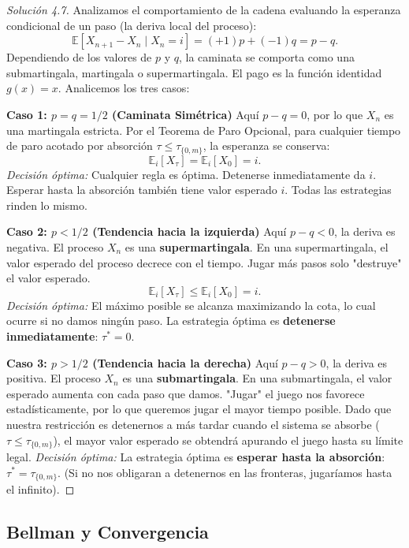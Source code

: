 \documentclass[10pt,a4paper]{article}
\begin{document}
\begin{proof}[Solución 4.7]
    Analizamos el comportamiento de la cadena evaluando la esperanza condicional de un paso (la deriva local del proceso):
    \[ \mathbb{E}[X_{n+1} - X_n \mid X_n = i] = (+1)p + (-1)q = p - q. \]
    Dependiendo de los valores de $p$ y $q$, la caminata se comporta como una submartingala, martingala o supermartingala. El pago es la función identidad $g(x) = x$. Analicemos los tres casos:

    \textbf{Caso 1: $p = q = 1/2$ (Caminata Simétrica)}
    Aquí $p - q = 0$, por lo que $X_n$ es una martingala estricta. 
    Por el Teorema de Paro Opcional, para cualquier tiempo de paro acotado por absorción $\tau \le \tau_{\{0,m\}}$, la esperanza se conserva:
    \[ \mathbb{E}_i[X_\tau] = \mathbb{E}_i[X_0] = i. \]
    \textit{Decisión óptima:} Cualquier regla es óptima. Detenerse inmediatamente da $i$. Esperar hasta la absorción también tiene valor esperado $i$. Todas las estrategias rinden lo mismo.

    \textbf{Caso 2: $p < 1/2$ (Tendencia hacia la izquierda)}
    Aquí $p - q < 0$, la deriva es negativa. El proceso $X_n$ es una \textbf{supermartingala}. 
    En una supermartingala, el valor esperado del proceso decrece con el tiempo. Jugar más pasos solo "destruye" el valor esperado.
    \[ \mathbb{E}_i[X_\tau] \le \mathbb{E}_i[X_0] = i. \]
    \textit{Decisión óptima:} El máximo posible se alcanza maximizando la cota, lo cual ocurre si no damos ningún paso. La estrategia óptima es \textbf{detenerse inmediatamente}: $\tau^* = 0$.

    \textbf{Caso 3: $p > 1/2$ (Tendencia hacia la derecha)}
    Aquí $p - q > 0$, la deriva es positiva. El proceso $X_n$ es una \textbf{submartingala}.
    En una submartingala, el valor esperado aumenta con cada paso que damos. "Jugar" el juego nos favorece estadísticamente, por lo que queremos jugar el mayor tiempo posible. 
    Dado que nuestra restricción es detenernos a más tardar cuando el sistema se absorbe ($\tau \le \tau_{\{0,m\}}$), el mayor valor esperado se obtendrá apurando el juego hasta su límite legal.
    \textit{Decisión óptima:} La estrategia óptima es \textbf{esperar hasta la absorción}: $\tau^* = \tau_{\{0,m\}}$. (Si no nos obligaran a detenernos en las fronteras, jugaríamos hasta el infinito).
\end{proof}

\newpage
\subsection{Bellman y Convergencia}
\end{document}
